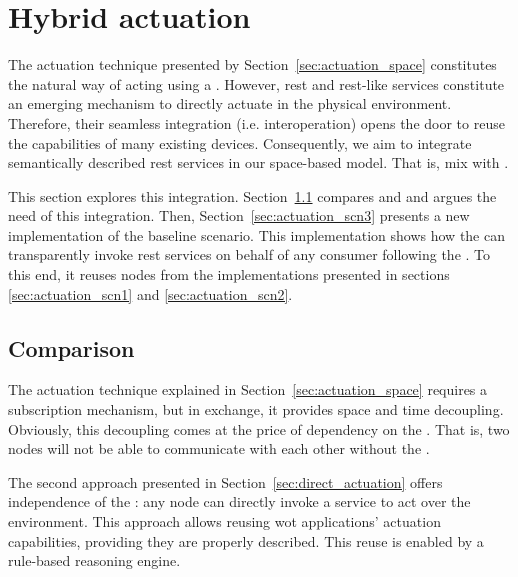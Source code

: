 \section{Hybrid actuation}
\label{sec:hybrid_actuation}

The actuation technique presented by Section~\ref{sec:actuation_space} constitutes the natural way of acting using a \Space{}.
However, \ac{rest} and \ac{rest}-like services constitute an emerging mechanism to directly actuate in the physical environment.
Therefore, their seamless integration (i.e. interoperation) opens the door to reuse the capabilities of many existing devices.
Consequently, we aim to integrate semantically described \ac{rest} services in our space-based model. %
That is, mix \spaceActuation{} with \restActuation{}.


This section explores this integration.
Section~\ref{sec:actuation_comparison} compares \spaceActuation{} and \restActuation{} and argues the need of this integration.
Then, Section~\ref{sec:actuation_scn3} presents a new implementation of the baseline scenario.
This implementation shows how the \Space{} can transparently invoke \ac{rest} services on behalf of any consumer following the \spaceActuation{}.
To this end, it reuses nodes from the implementations presented in sections \ref{sec:actuation_scn1} and \ref{sec:actuation_scn2}.


\subsection{Comparison}
\label{sec:actuation_comparison}

The actuation technique explained in Section~\ref{sec:actuation_space} requires a subscription mechanism, but in exchange, it provides space and time decoupling.
Obviously, this decoupling comes at the price of dependency on the \Space{}.
That is, two nodes will not be able to communicate with each other without the \Space{}.


The second approach presented in Section~\ref{sec:direct_actuation} offers independence of the \Space{}: any node can directly invoke a service to act over the environment.
This approach allows reusing \ac{wot} applications' actuation capabilities, providing they are properly described. %
This reuse is enabled by a rule-based reasoning engine. %


